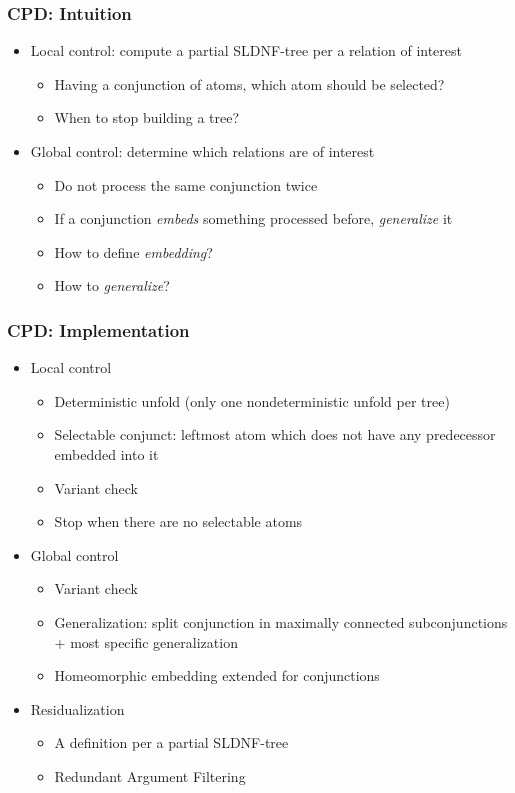 \documentclass[xcolor=table]{beamer}
\begin{document}
\begin{frame}[fragile]
  \transwipe[direction=90]
  \frametitle{CPD: Intuition}
\begin{itemize}
  \item Local control: compute a partial SLDNF-tree per a relation of interest
  \begin{itemize}
    \item Having a conjunction of atoms, which atom should be selected?
    \item When to stop building a tree?
  \end{itemize}
  \item Global control: determine which relations are of interest
  \begin{itemize}
    \item Do not process the same conjunction twice
    \item If a conjunction \textit{embeds} something processed before, \textit{generalize} it
    \item How to define \textit{embedding}?
    \item How to \textit{generalize}?
  \end{itemize}
\end{itemize}
\end{frame}

\begin{frame}[fragile]
  \transwipe[direction=90]
  \frametitle{CPD: Implementation}
\begin{itemize}
  \item Local control
  \begin{itemize}
    \item Deterministic unfold (only one nondeterministic unfold per tree)
    \item Selectable conjunct: leftmost atom which does not have any predecessor embedded into it
    \item Variant check
    \item Stop when there are no selectable atoms
  \end{itemize}
  \item Global control
  \begin{itemize}
    \item Variant check
    \item Generalization: split conjunction in maximally connected subconjunctions + most specific generalization
    \item Homeomorphic embedding extended for conjunctions
  \end{itemize}
  \item Residualization
  \begin{itemize}
    \item A definition per a partial SLDNF-tree
    \item Redundant Argument Filtering
  \end{itemize}
\end{itemize}
\end{frame}
\end{document}
